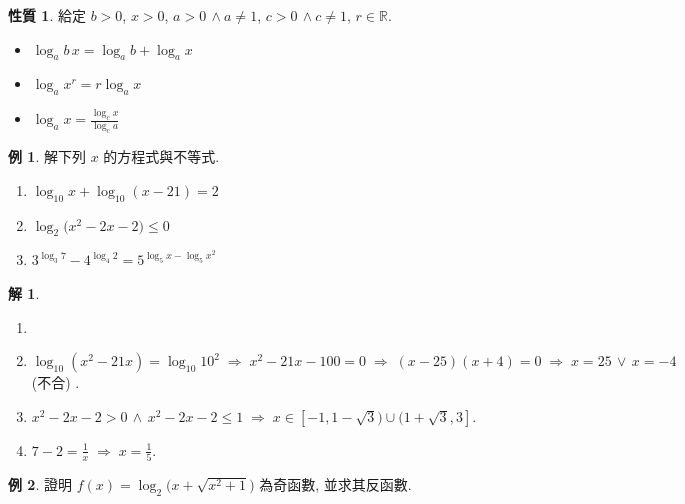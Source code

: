 \documentclass[12pt,a4paper]{extarticle}
\newcommand{\ds}{\displaystyle}
\newcommand{\ie}{\;\Longrightarrow\;}
\theoremstyle{definition}
\newtheorem*{prp}{性質}
\newtheorem*{ex}{例}
\newtheorem*{sol}{解}
\begin{document}
\begin{prp} 給定 $b > 0$, $x > 0$, $a > 0\,\wedge a\not=1$, $c > 0\,\wedge c\not=1$, $r\in\mathbb{R}$. 
  \setlength{\columnsep}{-0mm}
  \begin{multicols}{3}
    \begin{itemize}\setlength\itemsep{0em}
      \item $\log_a b\,x = \log_a b + \log_a x$
      \item $\ds\log_a x^r = r\log_a x$
      \item $\ds\log_a x = \frac{\log_c x}{\log_c a}$
    \end{itemize}
  \end{multicols}
\end{prp}

\begin{ex} 解下列 $x$ 的方程式與不等式. 
  \setlength{\columnsep}{-5mm}
  \begin{multicols}{3}
    \begin{enumerate}\setlength\itemsep{0em}
      \item $\ds\log_{10} x + \log_{10}(x - 21) = 2$
      \item $\ds\log_2\big(x^2 - 2x - 2\big)\leqslant 0$
      \item $\ds 3^{\log_3 7} - 4^{\log_4 2} = 5^{\log_5 x - \log_5 x^2}$
    \end{enumerate}
  \end{multicols}
\end{ex}

\begin{sol}
  \vspace{-0.5em}
  \begin{enumerate}\setlength\itemsep{0em}
    \item[]
    \item $\ds\log_{10} (x^2 - 21 x) = \log_{10} 10^2 \ie x^2 - 21x - 100 = 0 \ie (x - 25)(x + 4) = 0 \ie x = 25\,\vee\,x = -4$ (不合) . 
    \item $\ds x^2 - 2x - 2 > 0\,\wedge\, x^2 - 2x - 2\leqslant 1 \ie x \in [-1, 1 - \sqrt{3})\cup (1 + \sqrt{3}, 3]$. 
    \item $\ds 7 - 2 = \frac{1}{x} \ie x = \frac{1}{5}$. 
  \end{enumerate}
\end{sol}

\begin{ex}
  證明 $\ds f(x) = \log_2\big(x + \sqrt{x^2 + 1}\big)$ 為奇函數, 並求其反函數. 
\end{ex}
\end{document}
